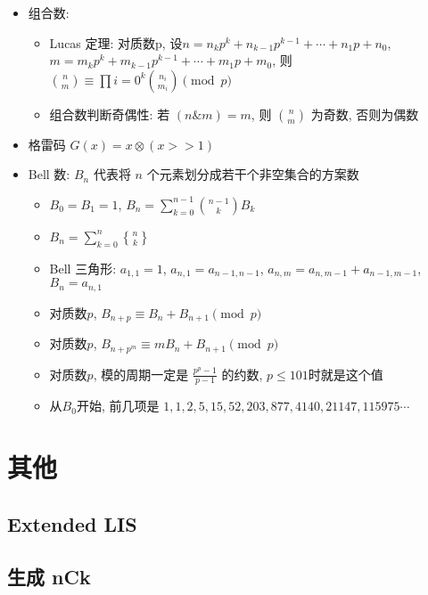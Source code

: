 \documentclass[landscape, twocolumn, 8pt, a4paper, twoside]{extarticle}
\newcommand{\stb}[2]{\genfrac{ \{ }{ \} }{0pt}{}{#1}{#2}}
\begin{document}
\begin{itemize}
\begin{enumerate}
    \end{enumerate}
  \item 组合数:
    \begin{itemize}
    \item Lucas 定理:
      对质数p,
      设$n = n_k p^k + n_{k - 1} p ^ {k - 1} + \cdots + n_1 p + n_0$,
      $m = m_k p^k + m_{k - 1} p ^ {k - 1} + \cdots + m_1 p + m_0$,
      则 $ \binom{n}{m} \equiv \prod{i = 0}^{k}\binom{n_i}{m_i} \pmod{p}$
    \item 组合数判断奇偶性:
      若 $(n \& m) = m$, 则 $\binom{n}{m}$ 为奇数, 否则为偶数
    \end{itemize}
  \item 格雷码 $G(x) = x \otimes (x >> 1) $
  \item Bell 数: $B_n$ 代表将 $n$ 个元素划分成若干个非空集合的方案数
    \begin{itemize}
    \item $B_0 = B_1 = 1$, $B_n = \sum\limits_{k = 0}^{n - 1} \binom{n - 1}{k} B_k$
    \item $B_n = \sum\limits_{k = 0}^{n} \stb{n}{k} $
    \item Bell 三角形: $a_{1, 1} = 1$, $a_{n, 1} = a_{n - 1, n - 1}$, $a_{n, m} = a_{n, m - 1} + a_{n - 1, m - 1}$, $B_n = a_{n, 1}$
    \item 对质数$p$, $B_{n + p} \equiv B_n + B_{n + 1} \pmod{p}$
    \item 对质数$p$, $B_{n + p^m} \equiv mB_n + B_{n + 1} \pmod{p}$
    \item 对质数$p$, 模的周期一定是 $\frac{p^p - 1}{p - 1}$ 的约数, $p \le 101$时就是这个值
    \item 从$B_0$开始, 前几项是 $1, 1, 2, 5, 15, 52, 203, 877, 4140, 21147, 115975 \cdots$
    \end{itemize}
  \end{itemize}

\section{其他}
  \subsection{Extended LIS}
    

  \subsection{生成 nCk}
    
\end{document}

